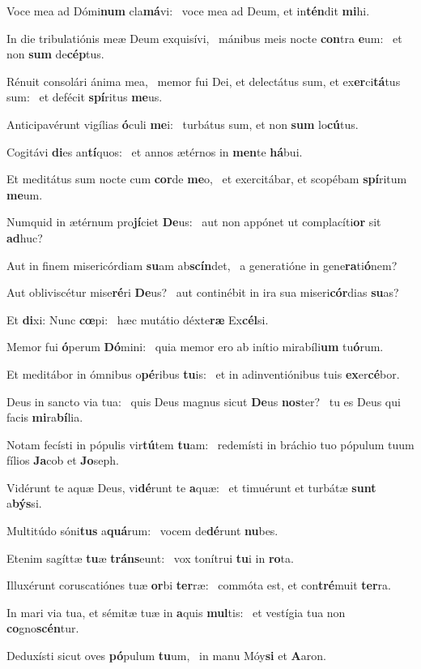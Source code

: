\item Voce mea ad Dómi\textbf{num} cla\textbf{má}vi:~\psstar{} voce mea ad Deum, et in\textbf{tén}dit \textbf{mi}hi.
\item In die tribulatiónis meæ Deum exquisívi,~\pscross{} mánibus meis nocte \textbf{con}tra \textbf{e}um:~\psstar{} et non \textbf{sum} de\textbf{cép}tus.
\item Rénuit consolári ánima mea,~\pscross{} memor fui Dei, et delectátus sum, et ex\textbf{er}ci\textbf{tá}tus sum:~\psstar{} et defécit \textbf{spí}ritus \textbf{me}us.
\item Anticipavérunt vigílias \textbf{ó}culi \textbf{me}i:~\psstar{} turbátus sum, et non \textbf{sum} lo\textbf{cú}tus.
\item Cogitávi \textbf{di}es an\textbf{tí}quos:~\psstar{} et annos ætérnos in \textbf{men}te \textbf{há}bui.
\item Et meditátus sum nocte cum \textbf{cor}de \textbf{me}o,~\psstar{} et exercitábar, et scopébam \textbf{spí}ritum \textbf{me}um.
\item Numquid in ætérnum pro\textbf{jí}ciet \textbf{De}us:~\psstar{} aut non appónet ut complacíti\textbf{or} sit \textbf{ad}huc?
\item Aut in finem misericórdiam \textbf{su}am ab\textbf{scín}det,~\psstar{} a generatióne in gene\textbf{ra}ti\textbf{ó}nem?
\item Aut obliviscétur mise\textbf{ré}ri \textbf{De}us?~\psstar{} aut continébit in ira sua miseri\textbf{cór}dias \textbf{su}as?
\item Et \textbf{di}xi: Nunc \textbf{cœ}pi:~\psstar{} hæc mutátio déxte\textbf{ræ} Ex\textbf{cél}si.
\item Memor fui \textbf{ó}perum \textbf{Dó}mini:~\psstar{} quia memor ero ab inítio mirabíli\textbf{um} tu\textbf{ó}rum.
\item Et meditábor in ómnibus o\textbf{pé}ribus \textbf{tu}is:~\psstar{} et in adinventiónibus tuis \textbf{ex}er\textbf{cé}bor.
\item Deus in sancto via tua:~\pscross{} quis Deus magnus sicut \textbf{De}us \textbf{nos}ter?~\psstar{} tu es Deus qui facis \textbf{mi}ra\textbf{bí}lia.
\item Notam fecísti in pópulis vir\textbf{tú}tem \textbf{tu}am:~\psstar{} redemísti in bráchio tuo pópulum tuum fílios \textbf{Ja}cob et \textbf{Jo}seph.
\item Vidérunt te aquæ Deus, vi\textbf{dé}runt te \textbf{a}quæ:~\psstar{} et timuérunt et turbátæ \textbf{sunt} a\textbf{býs}si.
\item Multitúdo sóni\textbf{tus} a\textbf{quá}rum:~\psstar{} vocem de\textbf{dé}runt \textbf{nu}bes.
\item Etenim sagíttæ \textbf{tu}æ \textbf{tráns}\-eunt:~\psstar{} vox tonítrui \textbf{tu}i in \textbf{ro}ta.
\item Illuxérunt coruscatiónes tuæ \textbf{or}bi \textbf{ter}ræ:~\psstar{} commóta est, et con\textbf{tré}muit \textbf{ter}ra.
\item In mari via tua, et sémitæ tuæ in \textbf{a}quis \textbf{mul}tis:~\psstar{} et vestígia tua non \textbf{co}gno\textbf{scén}tur.
\item Deduxísti sicut oves \textbf{pó}pulum \textbf{tu}um,~\psstar{} in manu Móy\textbf{si} et \textbf{A}aron.
